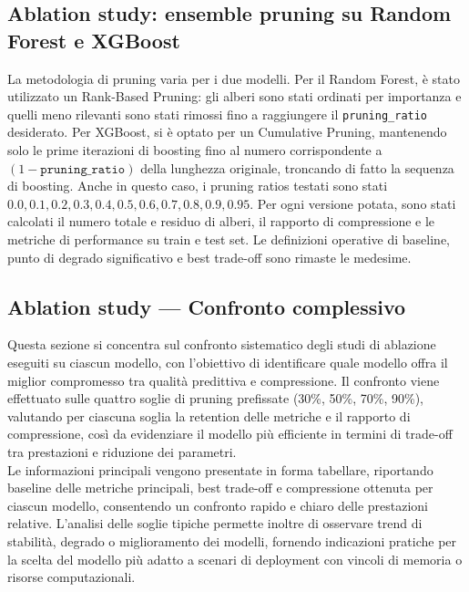 \documentclass[a4paper,12pt]{report}
\begin{document}
	\subsection{Ablation study: ensemble pruning su Random Forest e XGBoost}
	
	La metodologia di pruning varia per i due modelli. Per il Random Forest, è stato utilizzato un Rank-Based Pruning: gli alberi sono stati ordinati per importanza e quelli meno rilevanti sono stati rimossi fino a raggiungere il \texttt{pruning\_ratio} desiderato. Per XGBoost, si è optato per un Cumulative Pruning, mantenendo solo le prime iterazioni di boosting fino al numero corrispondente a \((1 - \texttt{pruning\_ratio})\) della lunghezza originale, troncando di fatto la sequenza di boosting. Anche in questo caso, i pruning ratios testati sono stati ${0.0,0.1,0.2,0.3,0.4,0.5,0.6,0.7,0.8,0.9,0.95}$. Per ogni versione potata, sono stati calcolati il numero totale e residuo di alberi, il rapporto di compressione e le metriche di performance su train e test set. Le definizioni operative di baseline, punto di degrado significativo e best trade-off sono rimaste le medesime. \\
	
	\subsection{Ablation study — Confronto complessivo}
	Questa sezione si concentra sul confronto sistematico degli studi di ablazione eseguiti su ciascun modello, con l’obiettivo di identificare quale modello offra il miglior compromesso tra qualità predittiva e compressione. Il confronto viene effettuato sulle quattro soglie di pruning prefissate (30\%, 50\%, 70\%, 90\%), valutando per ciascuna soglia la retention delle metriche e il rapporto di compressione, così da evidenziare il modello più efficiente in termini di trade-off tra prestazioni e riduzione dei parametri. \\
	Le informazioni principali vengono presentate in forma tabellare, riportando baseline delle metriche principali, best trade-off e compressione ottenuta per ciascun modello, consentendo un confronto rapido e chiaro delle prestazioni relative. L’analisi delle soglie tipiche permette inoltre di osservare trend di stabilità, degrado o miglioramento dei modelli, fornendo indicazioni pratiche per la scelta del modello più adatto a scenari di deployment con vincoli di memoria o risorse computazionali. \\
	
\end{document}
